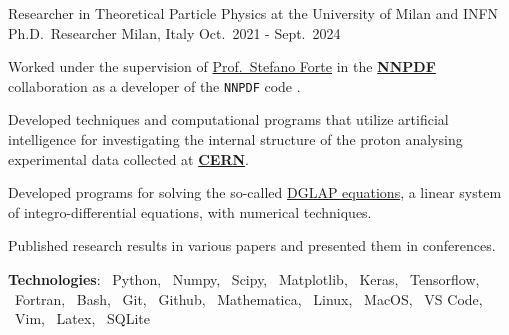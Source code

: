 

\begin{cventries}

  \cventry
  {Researcher in Theoretical Particle Physics at the University of Milan and INFN}
  {Ph.D.\ Researcher}
  {Milan, Italy}
  {Oct.\ 2021 - Sept.\ 2024}
  {
      \begin{cvitems} %
          \item Worked under the supervision of \href{https://inspirehep.net/authors/1009661?ui-citation-summary=true}{Prof.\ Stefano Forte} in the \href{https://nnpdf.mi.infn.it}{\textbf{NNPDF}} collaboration 
          as a developer of the \texttt{NNPDF} code \href{https://github.com/NNPDF}{\githublogo}.
          \item Developed techniques and computational programs that utilize artificial intelligence for 
          investigating the internal structure of the proton analysing experimental data collected at \href{https://home.cern}{\textbf{CERN}}.
          \item Developed programs for solving the so-called \href{https://en.wikipedia.org/wiki/DGLAP_evolution_equations}{DGLAP equations}, a linear system of integro-differential equations, with numerical techniques.
          \item Published research results in various papers and presented them in conferences.
          \item[] \textbf{\textcolor{awesome-red}{Tec}hnologies}: \pythonlogo{}~Python, \numpylogo{}~Numpy, \scipylogo{}~Scipy, \matplotliblogo{}~Matplotlib{}, \keraslogo{}~Keras, \tensorflowlogo{}~Tensorflow, \fortranlogo{}~Fortran, \bashlogo{}~Bash, \gitlogo{}~Git, \githublogo{}~Github, \mathematicalogo{}~Mathematica, \linuxlogo{}~Linux, \faApple{}~MacOS, \vscodelogo{}~VS Code, \vimlogo{}~Vim, \latexlogo{}~Latex, \sqlitelogo{}~SQLite
      \end{cvitems}
      }


\end{cventries}
